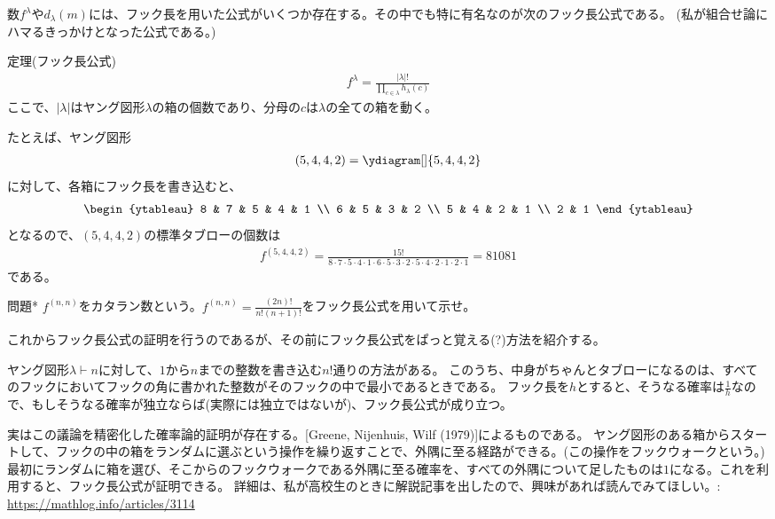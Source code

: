 \documentclass[a4paper,11pt]{jsarticle}
\theoremstyle{plain}
\theoremstyle{definition}
\renewcommand{\(}{\left(}
\renewcommand{\)}{\right)}
\renewcommand{\[}{\left[}
\renewcommand{\]}{\right]}
\renewcommand{\{}{\left\lbrace}
\renewcommand{\}}{\right\rbrace}
\begin{document}
数$f^\lambda$や$d_\lambda(m)$には、フック長を用いた公式がいくつか存在する。その中でも特に有名なのが次のフック長公式である。
(私が組合せ論にハマるきっかけとなった公式である。)

\begin{itembox}[l]{定理(フック長公式)}
    \begin{align*}  
        f^\lambda = \frac{|\lambda|!}{\displaystyle \prod_{c \in \lambda} h_{\lambda}(c)}
    \end{align*}
    ここで、$|\lambda|$はヤング図形$\lambda$の箱の個数であり、分母の$c$は$\lambda$の全ての箱を動く。
\end{itembox}

たとえば、ヤング図形
\begin{align*}
    (5,4,4,2) = \ydiagram[]{5,4,4,2}
\end{align*}
に対して、各箱にフック長を書き込むと、
\begin{align*}
    \begin{ytableau}
        8 & 7 & 5 & 4 & 1 \\
        6 & 5 & 3 & 2 \\
        5 & 4 & 2 & 1 \\
        2 & 1
    \end{ytableau}
\end{align*}
となるので、$(5,4,4,2)$の標準タブローの個数は
\begin{align*}
    f^{(5,4,4,2)} = \frac{15!}{8 \cdot 7 \cdot 5 \cdot 4 \cdot 1 \cdot 6 \cdot 5 \cdot 3 \cdot 2 \cdot 5 \cdot 4 \cdot 2 \cdot 1 \cdot 2 \cdot 1} = 81081
\end{align*}
である。

\begin{itembox}[l]{問題*}
    $f^{(n,n)}$をカタラン数という。$f^{(n,n)} = \frac{(2n)!}{n!(n+1)!}$をフック長公式を用いて示せ。
\end{itembox}

これからフック長公式の証明を行うのであるが、その前にフック長公式をぱっと覚える(?)方法を紹介する。

ヤング図形$\lambda \vdash n$に対して、$1$から$n$までの整数を書き込む$n!$通りの方法がある。
このうち、中身がちゃんとタブローになるのは、すべてのフックにおいてフックの角に書かれた整数がそのフックの中で最小であるときである。
フック長を$h$とすると、そうなる確率は$\frac{1}{h}$なので、もしそうなる確率が独立ならば(実際には独立ではないが)、フック長公式が成り立つ。

実はこの議論を精密化した確率論的証明が存在する。[Greene, Nijenhuis, Wilf (1979)]によるものである。
ヤング図形のある箱からスタートして、フックの中の箱をランダムに選ぶという操作を繰り返すことで、外隅に至る経路ができる。(この操作をフックウォークという。)
最初にランダムに箱を選び、そこからのフックウォークである外隅に至る確率を、すべての外隅について足したものは$1$になる。これを利用すると、フック長公式が証明できる。
詳細は、私が高校生のときに解説記事を出したので、興味があれば読んでみてほしい。:
\url{https://mathlog.info/articles/3114}
\end{document}
